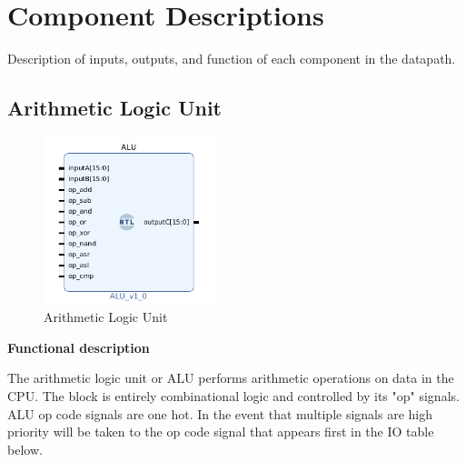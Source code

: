 \documentclass{article}
\begin{document}
\section{Component Descriptions}
\label{compd}
\begin{par}
	
	Description of inputs, outputs, and function of each component in the datapath. 
	
	\subsection{Arithmetic Logic Unit}
	
	\begin{figure}[H]
		\centering
		\includegraphics[width=2in]{img/alu.png}
		\caption{Arithmetic Logic Unit}
	\end{figure}

	\textbf{Functional description}
	\begin{par}
		The arithmetic logic unit or ALU performs arithmetic operations on data in the CPU. The block is entirely combinational logic and controlled by its "op" signals. ALU op code signals are one hot. In the event that multiple signals are high priority will be taken to the op code signal that appears first in the IO table below.  
	\end{par}
	

\end{par}
\end{document}
